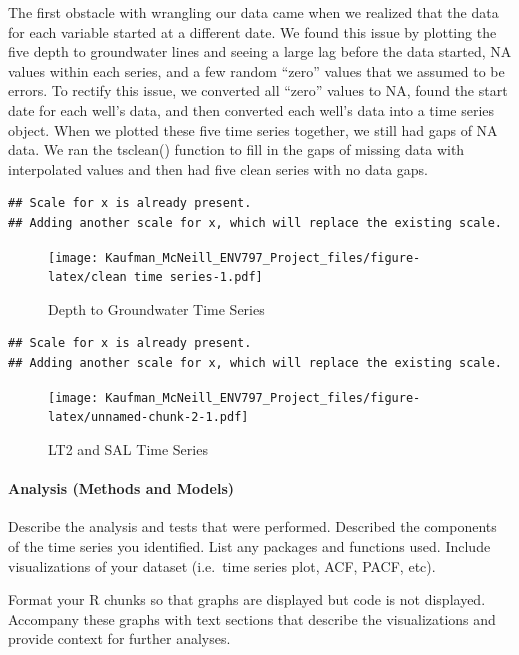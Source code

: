 \documentclass[
]{article}
\begin{document}
The first obstacle with wrangling our data came when we realized that
the data for each variable started at a different date. We found this
issue by plotting the five depth to groundwater lines and seeing a large
lag before the data started, NA values within each series, and a few
random ``zero'' values that we assumed to be errors. To rectify this
issue, we converted all ``zero'' values to NA, found the start date for
each well's data, and then converted each well's data into a time series
object. When we plotted these five time series together, we still had
gaps of NA data. We ran the tsclean() function to fill in the gaps of
missing data with interpolated values and then had five clean series
with no data gaps.

\begin{verbatim}
## Scale for x is already present.
## Adding another scale for x, which will replace the existing scale.
\end{verbatim}

\begin{figure}
\centering
\texttt{[image: Kaufman\_McNeill\_ENV797\_Project\_files/figure-latex/clean time series-1.pdf]}
\caption{Depth to Groundwater Time Series}
\end{figure}

\begin{verbatim}
## Scale for x is already present.
## Adding another scale for x, which will replace the existing scale.
\end{verbatim}

\begin{figure}
\centering
\texttt{[image: Kaufman\_McNeill\_ENV797\_Project\_files/figure-latex/unnamed-chunk-2-1.pdf]}
\caption{LT2 and SAL Time Series}
\end{figure}

\hypertarget{analysis-methods-and-models}{%
\paragraph{Analysis (Methods and
Models)}\label{analysis-methods-and-models}}

Describe the analysis and tests that were performed. Described the
components of the time series you identified. List any packages and
functions used. Include visualizations of your dataset (i.e.~time series
plot, ACF, PACF, etc).

Format your R chunks so that graphs are displayed but code is not
displayed. Accompany these graphs with text sections that describe the
visualizations and provide context for further analyses.
\end{document}
